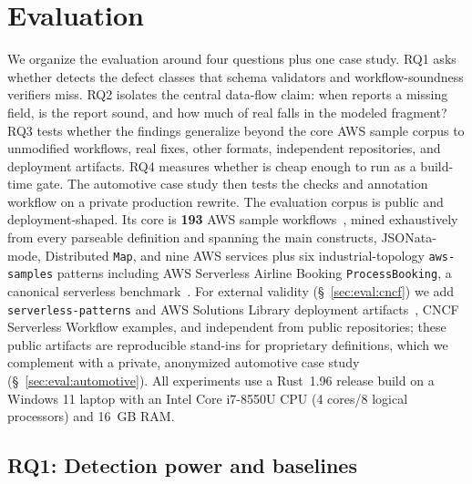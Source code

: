 \section{Evaluation}
\label{sec:eval}

We organize the evaluation around four questions plus one case study. RQ1 asks whether \tool{} detects
the defect classes that schema validators and workflow-soundness verifiers miss. RQ2 isolates the
central data-flow claim: when  reports a missing field, is the report sound, and how much
of real \asl{} falls in the modeled fragment? RQ3 tests whether the findings generalize beyond the
core AWS sample corpus to unmodified workflows, real fixes, other formats, independent repositories,
and deployment artifacts. RQ4 measures whether \tool{} is cheap enough to run as a build-time gate.
The automotive case study then tests the checks and annotation workflow on a private production
rewrite.
The evaluation corpus is public and deployment-shaped. Its core is \textbf{193} AWS sample
workflows~\cite{awsServerlessPatterns}, mined exhaustively from every parseable \asl{} definition and
spanning the main \asl{} constructs, JSONata-mode, Distributed \texttt{Map}, and nine AWS services
plus six industrial-topology
\texttt{aws-samples} patterns including AWS Serverless Airline Booking
\texttt{ProcessBooking}, a canonical serverless benchmark~\cite{awsServerlessAirline}.
For external validity (\S~\ref{sec:eval:cncf}) we add \texttt{serverless-patterns} and AWS Solutions
Library deployment artifacts~\cite{awsServerlessPatterns,awsSolutionsLibrary}, CNCF Serverless Workflow
examples, and independent \asl{} from public repositories; these public artifacts are reproducible
stand-ins for proprietary definitions, which we complement with a private, anonymized automotive
case study (\S~\ref{sec:eval:automotive}). All experiments use a Rust~1.96 release build on a
Windows 11 laptop with an Intel Core i7-8550U CPU (4 cores/8 logical processors) and 16~GB RAM.

\subsection{RQ1: Detection power and baselines}
\label{sec:eval:mut}
\label{sec:eval:baseline}

